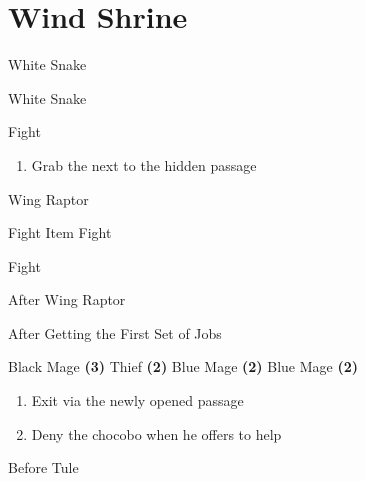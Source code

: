 \chapter{Wind Shrine}

\vspace{\baselineskip}

\begin{paracol}{2}
	
\switchcolumn
\begin{steproute}{White Snake}
\end{steproute}

\switchcolumn
\begin{encounter}{White Snake}
	\varwb
	\begin{notes}
		\item {}
	\end{notes}
	\begin{round}{1}
		\faris Fight
	\end{round}
	\varwe
\end{encounter}

\begin{enumerate}
	\item Grab the  next to the hidden passage
\end{enumerate}

\begin{boss}{Wing Raptor}
	\varwb
	\begin{round}{1}
		\everyone Fight
		\galuf Item \then {} \then Fight
	\end{round}
	\begin{round}{2}
		\everyone Fight
	\end{round}
	\varwe
\end{boss}

\switchcolumn
\begin{steproute}{After Wing Raptor}
\end{steproute}

\switchcolumn
\begin{menu}{After Getting the First Set of Jobs}
	\varwb
	\begin{jobMenu}
		\faris Black Mage \textbf{(3\pointLeft)}
		\bartz Thief \textbf{(2\pointRight)} \optimize
		\lenna Blue Mage \textbf{(2\pointLeft)} \optimize
		\galuf Blue Mage \textbf{(2\pointLeft)} \optimize
	\end{jobMenu}
	\varwe
\end{menu}

\begin{enumerate}[resume]
	\item Exit via the newly opened passage
	\item Deny the chocobo when he offers to help 
\end{enumerate}

\switchcolumn
\begin{steproute}{Before Tule}
\end{steproute}

\end{paracol}

